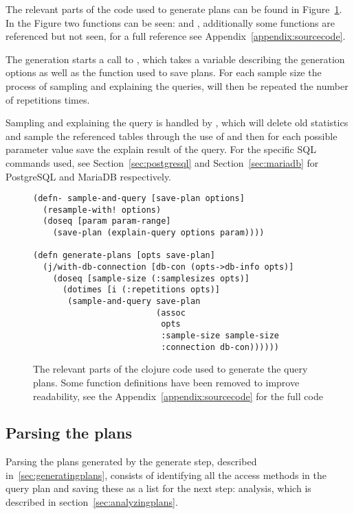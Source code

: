The relevant parts of the code used to generate plans can be found in
Figure~\ref{fig:clj:generating}. In the Figure two functions can be seen:
 and , additionally some functions are
referenced but not seen, for a full reference see Appendix~\ref{appendix:sourcecode}.

The generation starts a call to , which takes a variable
describing the generation options as well as the function used to save plans.
For each sample size the process of sampling and explaining the queries, will
then be repeated the number of repetitions times.

Sampling and explaining the query is handled by , which
will delete old statistics and sample the referenced tables through the use of
 and then for each possible parameter value save the explain
result of the query. For the specific SQL commands used, see
Section~\ref{sec:postgresql} and Section~\ref{sec:mariadb} for PostgreSQL and MariaDB respectively.

\begin{figure}[ht]
  \begin{verbatim}
(defn- sample-and-query [save-plan options]
  (resample-with! options)
  (doseq [param param-range]
    (save-plan (explain-query options param))))

(defn generate-plans [opts save-plan]
  (j/with-db-connection [db-con (opts->db-info opts)]
    (doseq [sample-size (:samplesizes opts)]
      (dotimes [i (:repetitions opts)]
       (sample-and-query save-plan
                         (assoc
                          opts
                          :sample-size sample-size
                          :connection db-con))))))
   \end{verbatim}
   \caption[The clojure code to generate a query]{The relevant parts of the
     clojure code used to generate the query plans. Some function definitions
     have been removed to improve readability, see the
     Appendix~\ref{appendix:sourcecode} for the full code}
\label{fig:clj:generating}
\end{figure}

\subsection{Parsing the plans}\label{sec:parsing}
Parsing the plans generated by the generate step, described
in~\ref{sec:generatingplans}, consists of identifying all the access
methods in the query plan and saving these as a list for the next step:
analysis, which is described in section~\ref{sec:analyzingplans}.

